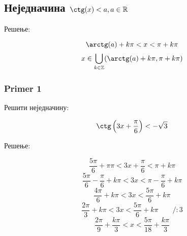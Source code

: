 \documentclass[../diplomski.tex]{subfiles}
\begin{document}
\subsection{Неједначина $\ctg(x)<a,a\in\mathbb{R}$}

Решење:



\[\arctg(a)+k\pi<x<\pi+k\pi\]
\[x\in\bigcup_{k\in\mathbb{Z}}(\arctg(a)+k\pi,\pi+k\pi)\]

\subsubsection{Primer 1}

Решити неједначину:

\[\ctg\left(3x+\frac{\pi}{6}\right)<-\sqrt{3}\]

Решење:



\[\frac{5\pi}{6}+\pi\pi<3x+\frac{\pi}{6}<\pi+k\pi\]
\[\frac{5\pi}{6}-\frac{\pi}{6}+k\pi<3x<\pi-\frac{\pi}{6}+k\pi\]
\[\frac{4\pi}{6}+k\pi<3x<\frac{5\pi}{6}+k\pi\]
\[\frac{2\pi}{3}+k\pi<3x<\frac{5\pi}{6}+k\pi\qquad/:3\]
\[\frac{2\pi}{9}+\frac{k\pi}{3}<x<\frac{5\pi}{18}+\frac{k\pi}{3}\]
\end{document}
